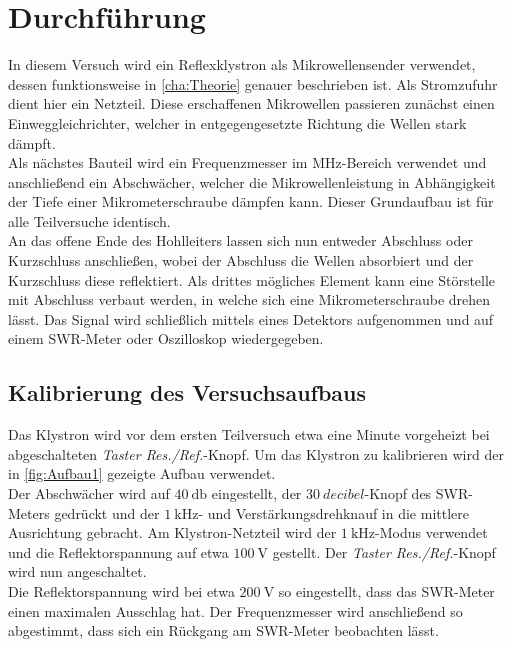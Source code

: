 \chapter{Durchführung}
\label{cha:Durchführung}
In diesem Versuch wird ein Reflexklystron als Mikrowellensender verwendet, dessen funktionsweise in \autoref{cha:Theorie} genauer beschrieben ist. 
Als Stromzufuhr dient hier ein Netzteil. Diese erschaffenen Mikrowellen passieren zunächst einen Einweggleichrichter, welcher in entgegengesetzte Richtung
die Wellen stark dämpft.\\
Als nächstes Bauteil wird ein Frequenzmesser im MHz-Bereich verwendet und anschließend ein Abschwächer, welcher die Mikrowellenleistung in Abhängigkeit der Tiefe
einer Mikrometerschraube dämpfen kann. Dieser Grundaufbau ist für alle Teilversuche identisch.\\
An das offene Ende des Hohlleiters lassen sich nun entweder Abschluss oder Kurzschluss anschließen, wobei der Abschluss die Wellen absorbiert und der Kurzschluss diese
reflektiert. Als drittes mögliches Element kann eine Störstelle mit Abschluss verbaut werden, in welche sich eine Mikrometerschraube drehen lässt. Das Signal wird schließlich
mittels eines Detektors aufgenommen und auf einem SWR-Meter oder Oszilloskop wiedergegeben.

\section{Kalibrierung des Versuchsaufbaus}
Das Klystron wird vor dem ersten Teilversuch etwa eine Minute vorgeheizt bei abgeschalteten \textit{Taster Res./Ref.}-Knopf. Um das Klystron zu kalibrieren wird der in \autoref{fig:Aufbau1} gezeigte
Aufbau verwendet.\\
Der Abschwächer wird auf $\qty{40}{\decibel}$ eingestellt, der $\qty{30}{decibel}$-Knopf des SWR-Meters gedrückt und der $\qty{1}{\kilo\hertz}$- und Verstärkungsdrehknauf in die mittlere Ausrichtung
gebracht. Am Klystron-Netzteil wird der $\qty{1}{\kilo\hertz}$-Modus verwendet und die Reflektorspannung auf etwa $\qty{100}{\volt}$ gestellt. Der  \textit{Taster Res./Ref.}-Knopf wird nun angeschaltet.\\
Die Reflektorspannung wird bei etwa $\qty{200}{\volt}$ so eingestellt, dass das SWR-Meter einen maximalen Ausschlag hat. Der Frequenzmesser wird anschließend so abgestimmt, dass sich ein Rückgang am SWR-Meter beobachten lässt.

